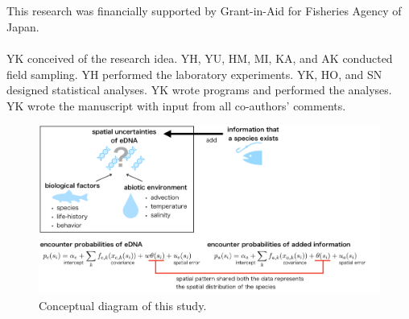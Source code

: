\documentclass[12pt]{article}
\begin{document}
\begin{linenumbers}
\ \\
\\
This research was financially supported by Grant-in-Aid for Fisheries Agency of Japan.
\ \\

\\
YK conceived of the research idea. YH, YU, HM, MI, KA, and AK conducted field sampling. YH performed the laboratory experiments. YK, HO, and SN designed statistical analyses. YK wrote programs and performed the analyses. YK wrote the manuscript with input from all co-authors' comments.
\ \\

\newpage
\begin{figure}[h]
  \centering
  \includegraphics[width = 18cm]{idea.png}
  \caption{Conceptual diagram of this study.}
\end{figure}



\end{linenumbers}
\end{document}
